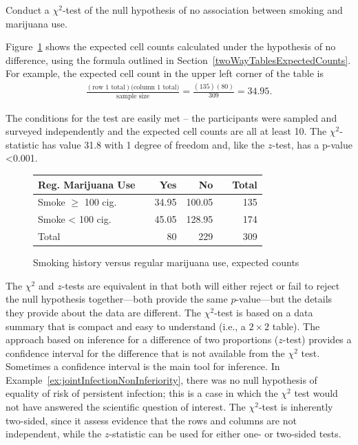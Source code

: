 \begin{examplewrap}
\begin{nexample}{Conduct a $\chi^2$-test of the null hypothesis of no association between smoking and marijuana use.}\label{ex:smoke100RegMarijChiSquared}

Figure~\ref{figure:smoke100RegMarijuanaExpected} shows the expected cell counts calculated under the hypothesis of no difference, using the formula outlined in Section~\ref{twoWayTablesExpectedCounts}.  For example, the expected cell count in the upper left corner of the table is
\begin{align*}
  \frac{(\text{row 1 total})(\text{column 1 total)}}{\text{sample size}} =
  \frac{(135)(80)}{309} = 34.95.
\end{align*}

The conditions for the test are easily met -- the participants were sampled and surveyed independently and the expected cell counts are all at least 10.  The $\chi^2$-statistic  has value 31.8 with 1 degree of freedom and, like the $z$-test, has a p-value <0.001.
\end{nexample}
\end{examplewrap}


\begin{figure}[ht]
  \centering
  \begin{tabular}{ll rrr r}
    \hline
    Reg. Marijuana Use  & \hspace{2mm} & Yes & No & \hspace{2mm} & Total \\
    \hline
    Smoke $\geq$ 100 cig. & & 34.95 & 100.05 &  & 135  \\
    Smoke < 100 cig. & & 45.05 & 128.95 &  &  174  \\
        Total & & 80 & 229 & & 309 \\
    \hline
  \end{tabular}
    \caption{Smoking history versus regular marijuana use, expected counts}
    \label{figure:smoke100RegMarijuanaExpected}
\end{figure}

The $\chi^2$ and $z$-tests are equivalent in that both will either reject or fail to reject the null hypothesis together---both provide the same $p$-value---but the details they provide about the data are different.  The $\chi^2$-test is based on a data summary that is compact and easy to understand (i.e., a $2 \times 2$ table).  The approach based on inference for a difference of two proportions ($z$-test) provides a confidence interval for the difference that is not available from the $\chi^2$ test. Sometimes a confidence interval is the main tool for inference.  In Example~\ref{ex:jointInfectionNonInferiority}, there was no null hypothesis of equality of risk of persistent infection; this is a case in which the $\chi^2$ test would not have answered the scientific question of interest. The $\chi^2$-test is inherently two-sided, since it assess evidence that the rows and columns are not independent, while the $z$-statistic can be used for either one- or two-sided tests.

